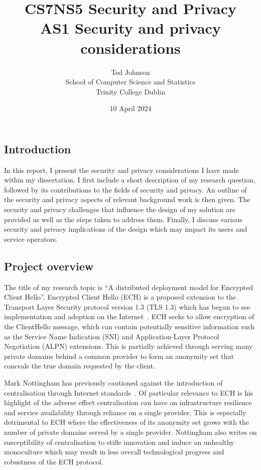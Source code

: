 \documentclass[a4paper,oneside,12pt]{article}
\title{CS7NS5 Security and Privacy\\AS1 Security and privacy considerations}
\author{Ted Johnson\\School of Computer Science and Statistics\\Trinity College Dublin}
\date{10 April 2024}
\begin{document}
\maketitle
\onehalfspacing

\subsection*{Introduction}

In this report, I present the security and privacy considerations I have made within my dissertation. I first include a short description of my research question, followed by its contributions to the fields of security and privacy. An outline of the security and privacy aspects of relevant background work is then given. The security and privacy challenges that influence the design of my solution are provided as well as the steps taken to address them. Finally, I discuss various security and privacy implications of the design which may impact its users and service operators.

\subsection*{Project overview}

The title of my research topic is ``A distributed deployment model for Encrypted Client Hello''. Encrypted Client Hello (ECH) is a proposed extension to the Transport Layer Security protocol version 1.3 (TLS 1.3) which has begun to see implementation and adoption on the Internet~\cite{tsiatsikas2022measuring, CF-ECH}. ECH seeks to allow encryption of the ClientHello message, which can contain potentially sensitive information such as the Service Name Indication (SNI) and Application-Layer Protocol Negotiation (ALPN) extensions. This is partially achieved through serving many private domains behind a common provider to form an anonymity set that conceals the true domain requested by the client.

Mark Nottingham has previously cautioned against the introduction of centralisation through Internet standards~\cite{rfc9518}. Of particular relevance to ECH is his highlight of the adverse effect centralisation can have on infrastructure resilience and service availability through reliance on a single provider. This is especially detrimental to ECH where the effectiveness of its anonymity set grows with the number of private domains served by a single provider. Nottingham also writes on susceptibility of centralisation to stifle innovation and induce an unhealthy monoculture which may result in less overall technological progress and robustness of the ECH protocol.
\end{document}

